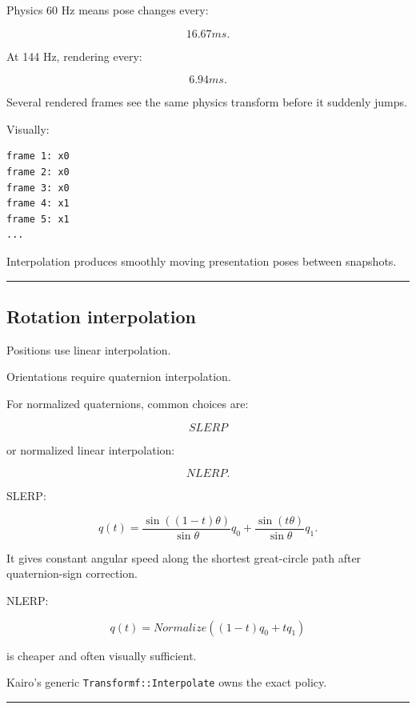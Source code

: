 Physics 60 Hz means pose changes every:

\[
16.67ms.
\]

At 144 Hz, rendering every:

\[
6.94ms.
\]

Several rendered frames see the same physics transform before it suddenly jumps.

Visually:

\begin{verbatim}
frame 1: x0
frame 2: x0
frame 3: x0
frame 4: x1
frame 5: x1
...
\end{verbatim}

Interpolation produces smoothly moving presentation poses between snapshots.

\begin{center}\rule{0.5\linewidth}{0.5pt}\end{center}

\subsection{Rotation interpolation}\label{06-engine-ii-ch037-rotation-interpolation}

\hypertarget{06-engine-ii-ch037-rotation-interpolation}{}

Positions use linear interpolation.

Orientations require quaternion interpolation.

For normalized quaternions, common choices are:

\[
SLERP
\]

or normalized linear interpolation:

\[
NLERP.
\]

SLERP:

\[
q(t)
=
\frac{
\sin((1-t)\theta)
}{
\sin\theta
}q_0
+
\frac{
\sin(t\theta)
}{
\sin\theta
}q_1.
\]

It gives constant angular speed along the shortest great-circle path after quaternion-sign correction.

NLERP:

\[
q(t)
=
Normalize(
(1-t)q_0+tq_1
)
\]

is cheaper and often visually sufficient.

Kairo's generic \texttt{Transformf::Interpolate} owns the exact policy.

\begin{center}\rule{0.5\linewidth}{0.5pt}\end{center}

